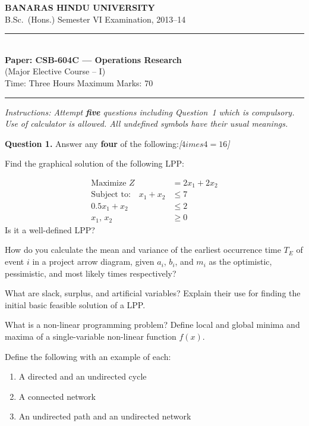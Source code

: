 \documentclass[11pt,a4paper]{article}
\newcommand{\pts}[1]{\hfill   \textit{[#1]}}
\begin{document}
\begin{center}
  {\large\bfseries BANARAS HINDU UNIVERSITY}\\[2pt]
  {
\normalsize B.Sc.\ (Hons.) Semester VI Examination, 2013--14}\\[6pt]
  \rule{0.8\linewidth}{0.5pt}\\[6pt]
  {\large\bfseries Paper: CSB-604C --- Operations Research}\\[4pt]
  {
\normalsize (Major Elective Course -- I)}\\[4pt]
  {
\normalsize Time: Three Hours \hfill Maximum Marks: 70}
\end{center}

\rule{\linewidth}{0.4pt}

\smallskip



\noindent   \textit{Instructions: Attempt   \textbf{five} questions including Question~1 which is compulsory. Use of calculator is allowed. All undefined symbols have their usual meanings.}

\bigskip




\noindent   \textbf{Question 1.} Answer any   \textbf{four} of the following:\pts{$4 imes4=16$}

\begin{parts}
  \item Find the graphical solution of the following LPP:
  
\begin{align*}
     \text{Maximize } Z &= 2x_1 + 2x_2 \\
     \text{Subject to:}\quad x_1 + x_2 &\leq 7 \\
    0.5x_1 + x_2 &\leq 2 \\
    x_1,\, x_2 &\geq 0
  \end{align*}
  Is it a well-defined LPP?

  \item How do you calculate the mean and variance of the earliest occurrence time $T_E$ of event $i$ in a project arrow diagram, given $a_i$, $b_i$, and $m_i$ as the optimistic, pessimistic, and most likely times respectively?

  \item What are slack, surplus, and artificial variables? Explain their use for finding the initial basic feasible solution of a LPP.

  \item What is a non-linear programming problem? Define local and global minima and maxima of a single-variable non-linear function $f(x)$.

  \item Define the following with an example of each:
  
\begin{enumerate}[label=(\roman*)]
    \item A directed and an undirected cycle
    \item A connected network
    \item An undirected path and an undirected network
  \end{enumerate}
\end{parts}
\end{document}
